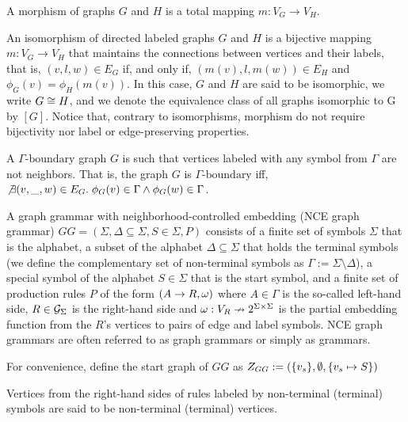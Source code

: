 \documentclass[]{report}
\begin{document}
\begin{definition}
	\label{def:morphism}
	A morphism of graphs $G$ and $H$ is a total mapping $m: V_G \to V_H$.
\end{definition}

\begin{definition}
	An isomorphism of directed labeled graphs $G$ and $H$ is a bijective mapping $m: V_G \to V_H$ that maintains the connections between vertices and their labels, that is, $(v,l,w) \in E_G$ if, and only if,  $(m(v),l,m(w)) \in E_H$ and $\phi_G(v) = \phi_H(m(v))$. In this case, $G$ and $H$ are said to be isomorphic, we write $G \isomorph H$, and we denote the equivalence class of all graphs isomorphic to G by $[G]$.
	Notice that, contrary to isomorphisms, morphism do not require bijectivity nor label or edge-preserving properties.
\end{definition}


\begin{definition}
	A $\Gamma\text{-boundary}$ graph $G$ is such that vertices labeled with any symbol from $\Gamma$ are not neighbors. That is, the graph $G$ is $\Gamma\text{-boundary}$ iff, $\not\exists (v,\_,w) \in E_G \. \phi_G(v) \in \Gamma \land \phi_G(w) \in \Gamma$.
\end{definition}

\begin{definition}
	\label{def:gg}
	A graph grammar with neighborhood-controlled embedding (NCE graph grammar) $GG = (\Sigma, \Delta \subseteq \Sigma, S \in \Sigma, P)$ consists of a finite set of symbols $\Sigma$ that is the alphabet, a subset of the alphabet $\Delta \subseteq \Sigma$ that holds the terminal symbols (we define the complementary set of non-terminal symbols as $\Gamma := \Sigma \setminus \Delta$), a special symbol of the alphabet $S \in \Sigma$ that is the start symbol, and a finite set of production rules $P$ of the form $(A \pro R, \omega)$ where $A \in \Gamma$ is the so-called left-hand side, $R \in \allgraphs{\Sigma}$ is the right-hand side and $\omega : V_R \pto 2^{\Sigma \times \Sigma}$ is the partial embedding function from the $R$'s vertices to pairs of edge and label symbols. NCE graph grammars are often referred to as graph grammars or simply as grammars.
	
	For convenience, define the start graph of $GG$ as $\startG{GG} := (\{v_s\},\emptyset,\{v_s \mapsto S\})$
	
	Vertices from the right-hand sides of rules labeled by non-terminal (terminal) symbols are said to be non-terminal (terminal) vertices.
\end{definition}
\end{document}
